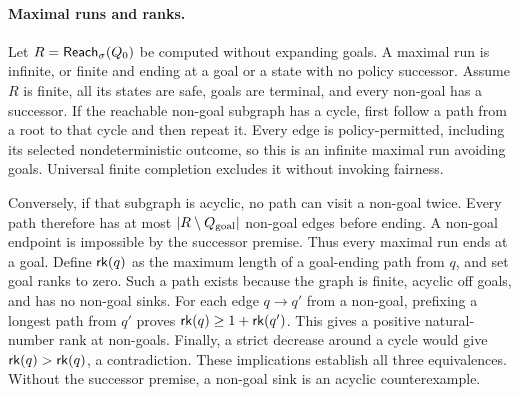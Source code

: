 \paragraph{Maximal runs and ranks.}\label{ta:maximal-ranks}
Let $R=\mathsf{Reach}_\sigma(Q_0)$ be computed without expanding goals. A maximal run is infinite, or finite and ending at a goal or a state with no policy successor. Assume $R$ is finite, all its states are safe, goals are terminal, and every non-goal has a successor. If the reachable non-goal subgraph has a cycle, first follow a path from a root to that cycle and then repeat it. Every edge is policy-permitted, including its selected nondeterministic outcome, so this is an infinite maximal run avoiding goals. Universal finite completion excludes it without invoking fairness.

Conversely, if that subgraph is acyclic, no path can visit a non-goal twice. Every path therefore has at most $|R\setminus Q_{\mathrm{goal}}|$ non-goal edges before ending. A non-goal endpoint is impossible by the successor premise. Thus every maximal run ends at a goal. Define $\mathsf{rk}(q)$ as the maximum length of a goal-ending path from $q$, and set goal ranks to zero. Such a path exists because the graph is finite, acyclic off goals, and has no non-goal sinks. For each edge $q\to q'$ from a non-goal, prefixing a longest path from $q'$ proves $\mathsf{rk}(q)\geq1+\mathsf{rk}(q')$. This gives a positive natural-number rank at non-goals. Finally, a strict decrease around a cycle would give $\mathsf{rk}(q)>\mathsf{rk}(q)$, a contradiction. These implications establish all three equivalences. Without the successor premise, a non-goal sink is an acyclic counterexample.

